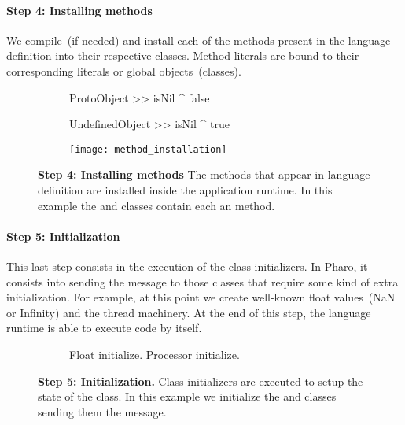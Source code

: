 \paragraph{\textbf{Step 4: Installing methods}}

We compile~(if needed) and install each of the methods present in the language definition into their respective classes. Method literals are bound to their corresponding literals or global objects~(\eg classes).

\begin{figure}[ht]
\begin{subfigure}{.4\linewidth}
\begin{code}
ProtoObject >> isNil
   ^ false

UndefinedObject >> isNil
   ^ true
\end{code}
\end{subfigure}
\begin{subfigure}{.6\linewidth}
\texttt{[image: method\_installation]}
\end{subfigure}
\caption{\textbf{Step 4: Installing methods} The methods that appear in language definition are installed inside the application runtime. In this example the  and  classes contain each an  method.\label{fig:method_installation}}
\end{figure}


\paragraph{\textbf{Step 5: Initialization}}
This last step consists in the execution of the class initializers. In Pharo, it consists into sending the message  to those classes that require some kind of extra initialization. For example, at this point we create well-known float values~(\eg NaN or Infinity) and the thread machinery. At the end of this step, the language runtime is able to execute code by itself.

\begin{figure}[ht]
\begin{subfigure}{.4\linewidth}
\begin{code}
Float initialize.
Processor initialize.
\end{code}
\end{subfigure}
\caption{\textbf{Step 5: Initialization.} Class initializers are executed to setup the state of the class. In this example we initialize the  and  classes sending them the  message.\label{fig:method_installation}}
\end{figure}


